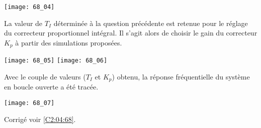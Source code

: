 \begin{center}
\texttt{[image: 68\_04]}
\end{center}

\ifprof
\else 
\fi

La valeur de $T_I$ déterminée à la question précédente est retenue pour le réglage du correcteur proportionnel intégral.
Il s’agit alors de choisir le gain du correcteur $K_p$ à partir des simulations proposées.

\begin{center}
\texttt{[image: 68\_05]}
\texttt{[image: 68\_06]}
\end{center}

\ifprof
\else 
\fi

Avec le couple de valeurs ($T_I$ et $K_p$) obtenu, la réponse fréquentielle du système en boucle ouverte a été tracée.


\begin{center}
\texttt{[image: 68\_07]}
\end{center}


\ifprof
\else 
\fi


\ifprof
\else

\noindent\footnotesize
\normalsize

\begin{flushright}
\footnotesize{Corrigé  voir \ref{C2:04:68}.}
\end{flushright}%
\fi
